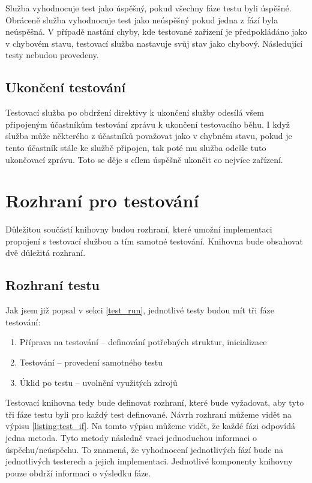 Služba vyhodnocuje test jako úspěšný, pokud všechny fáze testu byli úspěšné. Obráceně služba vyhodnocuje test jako neúspěšný pokud jedna z fází byla neúspěšná. V případě nastání chyby, kde testované zařízení je předpokládáno jako v chybovém stavu, testovací služba nastavuje svůj stav jako chybový. Následující testy nebudou provedeny.


\subsection{Ukončení testování}
Testovací služba po obdržení direktivy k ukončení služby odesílá všem připojeným účastníkům testování zprávu k ukončení testovacího běhu. I když služba může některého z účastníků považovat jako v chybném stavu, pokud je tento účastník stále ke službě připojen, tak poté mu služba odešle tuto ukončovací zprávu. Toto se děje s cílem úspěšně ukončit co nejvíce zařízení.


\section{Rozhraní pro testování}
Důležitou součástí knihovny budou rozhraní, které umožní implementaci propojení s testovací službou a tím samotné testování. Knihovna bude obsahovat dvě důležitá rozhraní. 

\subsection{Rozhraní testu}
Jak jsem již popsal v sekci \ref{test_run}, jednotlivé testy budou mít tři fáze testování:

\begin{enumerate}
    \item Příprava na testování -- definování potřebných struktur, inicializace
    \item Testování -- provedení samotného testu
    \item Úklid po testu -- uvolnění využitých zdrojů
\end{enumerate}

Testovací knihovna tedy bude definovat rozhraní, které bude vyžadovat, aby tyto tři fáze testu byli pro každý test definované. Návrh rozhraní můžeme vidět na výpisu \ref{listing:test_if}. Na tomto výpisu můžeme vidět, že každé fázi odpovídá jedna metoda. Tyto metody následně vrací jednoduchou informaci o úspěchu/neúspěchu. To znamená, že vyhodnocení jednotlivých fází bude na jednotlivých testerech a jejich implementaci. Jednotlivé komponenty knihovny pouze obdrží informaci o výsledku fáze.

